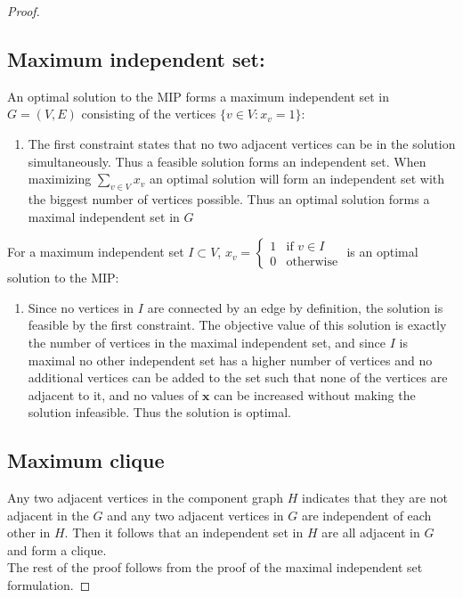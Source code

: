 \begin{example}
\begin{proof}
\subsection{Maximum independent set:}
An optimal solution to the MIP forms a maximum independent set in $G=(V,E)$ consisting of the vertices $\{v\in V:x_v=1\}$:
\begin{enumerate}
\item The first constraint states that no two adjacent vertices can be in the solution simultaneously. Thus a feasible solution forms an independent set.
When maximizing $\sum_{v\in V} x_v$ an optimal solution will form an independent set with the biggest number of vertices possible. Thus an optimal solution forms a maximal independent set in $G$
\end{enumerate}
For a maximum independent set $I\subset V$, $x_{v} = \left\{
\begin{array}{ll}
1 & \text{if } v \in I \\ 0 & \text{otherwise}
\end{array}\right.$ is an optimal solution to the MIP:
\begin{enumerate}
\item Since no vertices in $I$ are connected by an edge by definition, the solution is feasible by the first constraint. The objective value of this solution is exactly the number of vertices in the maximal independent set, and since $I$ is maximal no other independent set has a higher number of vertices and no additional vertices can be added to the set such that none of the vertices are adjacent to it, and no values of $\textbf{x}$ can be increased without making the solution infeasible. Thus the solution is optimal.
\end{enumerate}
\subsection{Maximum clique}
Any two adjacent vertices in the component graph $H$ indicates that they are not adjacent in the $G$ and any two adjacent vertices in $G$ are independent of each other in $H$. Then it follows that an independent set in $H$ are all adjacent in $G$ and form a clique. \\
The rest of the proof follows from the proof of the maximal independent set formulation.
\end{proof}
\end{example}
